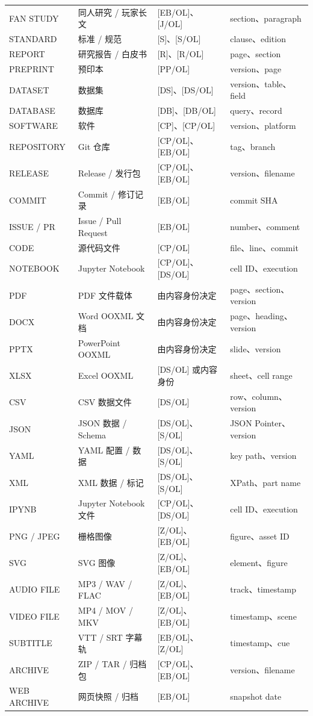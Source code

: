 \documentclass[profile=editorial,titlelayout=\AtelierSpecimenTitleLayout]{atelier}
\begin{document}
\begin{longtable}{@{}p{31mm}p{37mm}p{42mm}p{45mm}@{}}
FAN STUDY & 同人研究 / 玩家长文 & [EB/OL]、[J/OL] & section、paragraph \\
STANDARD & 标准 / 规范 & [S]、[S/OL] & clause、edition \\
REPORT & 研究报告 / 白皮书 & [R]、[R/OL] & page、section \\
PREPRINT & 预印本 & [PP/OL] & version、page \\
DATASET & 数据集 & [DS]、[DS/OL] & version、table、field \\
DATABASE & 数据库 & [DB]、[DB/OL] & query、record \\
SOFTWARE & 软件 & [CP]、[CP/OL] & version、platform \\
REPOSITORY & Git 仓库 & [CP/OL]、[EB/OL] & tag、branch \\
RELEASE & Release / 发行包 & [CP/OL]、[EB/OL] & version、filename \\
COMMIT & Commit / 修订记录 & [EB/OL] & commit SHA \\
ISSUE / PR & Issue / Pull Request & [EB/OL] & number、comment \\
CODE & 源代码文件 & [CP/OL] & file、line、commit \\
NOTEBOOK & Jupyter Notebook & [CP/OL]、[DS/OL] & cell ID、execution \\
PDF & PDF 文件载体 & 由内容身份决定 & page、section、version \\
DOCX & Word OOXML 文档 & 由内容身份决定 & page、heading、version \\
PPTX & PowerPoint OOXML & 由内容身份决定 & slide、version \\
XLSX & Excel OOXML & [DS/OL] 或内容身份 & sheet、cell range \\
CSV & CSV 数据文件 & [DS/OL] & row、column、version \\
JSON & JSON 数据 / Schema & [DS/OL]、[S/OL] & JSON Pointer、version \\
YAML & YAML 配置 / 数据 & [DS/OL]、[S/OL] & key path、version \\
XML & XML 数据 / 标记 & [DS/OL]、[S/OL] & XPath、part name \\
IPYNB & Jupyter Notebook 文件 & [CP/OL]、[DS/OL] & cell ID、execution \\
PNG / JPEG & 栅格图像 & [Z/OL]、[EB/OL] & figure、asset ID \\
SVG & SVG 图像 & [Z/OL]、[EB/OL] & element、figure \\
AUDIO FILE & MP3 / WAV / FLAC & [Z/OL]、[EB/OL] & track、timestamp \\
VIDEO FILE & MP4 / MOV / MKV & [Z/OL]、[EB/OL] & timestamp、scene \\
SUBTITLE & VTT / SRT 字幕轨 & [EB/OL]、[Z/OL] & timestamp、cue \\
ARCHIVE & ZIP / TAR / 归档包 & [CP/OL]、[EB/OL] & version、filename \\
WEB ARCHIVE & 网页快照 / 归档 & [EB/OL] & snapshot date \\
\bottomrule
\end{longtable}
\normalsize
\end{document}
